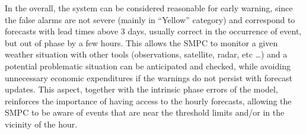 In the overall, the system can be considered reasonable for early warning, since the false alarms are not severe (mainly in “Yellow” category) and correspond to forecasts with lead times above 3 days, usually correct in the occurrence of event, but out of phase by a few hours. This allows the SMPC to monitor a given weather situation with other tools (observations, satellite, radar, etc \ldots) and a potential problematic situation can be anticipated and checked, while avoiding unnecessary economic expenditures if the warnings do not persist with forecast updates. This aspect, together with the intrinsic phase errors of the model, reinforces the importance of having access to the hourly forecasts, allowing the SMPC to be aware of events that are near the threshold limits and/or in the vicinity of the hour. 

